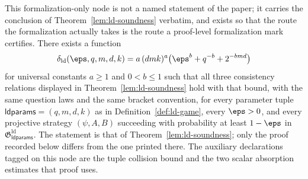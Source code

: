 \begin{theorem}
	\label{lem:ld-soundness-formalized}
	\leanok
	This formalization-only node is not a named statement of the paper; it carries the conclusion of Theorem~\ref{lem:ld-soundness} verbatim, and exists so that the route the formalization actually takes is the route a proof-level formalization mark certifies. There exists a function
	\[
		\delta_{\mathrm{ld}}(\eps, q, m, d, k) = a\,(dmk)^a \bigl(\eps^b + q^{-b} + 2^{-bmd}\bigr)
	\]
	for universal constants $a \ge 1$ and $0 < b \le 1$ such that all three consistency relations displayed in Theorem~\ref{lem:ld-soundness} hold with that bound, with the same question laws and the same bracket convention, for every parameter tuple $\mathsf{ldparams} = (q,m,d,k)$ as in Definition~\ref{def:ld-game}, every $\eps > 0$, and every projective strategy $(\psi, A, B)$ succeeding with probability at least $1-\eps$ in $\mathfrak{G}^{\mathrm{ld}}_{\mathsf{ldparams}}$. The statement is that of Theorem~\ref{lem:ld-soundness}; only the proof recorded below differs from the one printed there. The auxiliary declarations tagged on this node are the tuple collision bound and the two scalar absorption estimates that proof uses.
\end{theorem}
